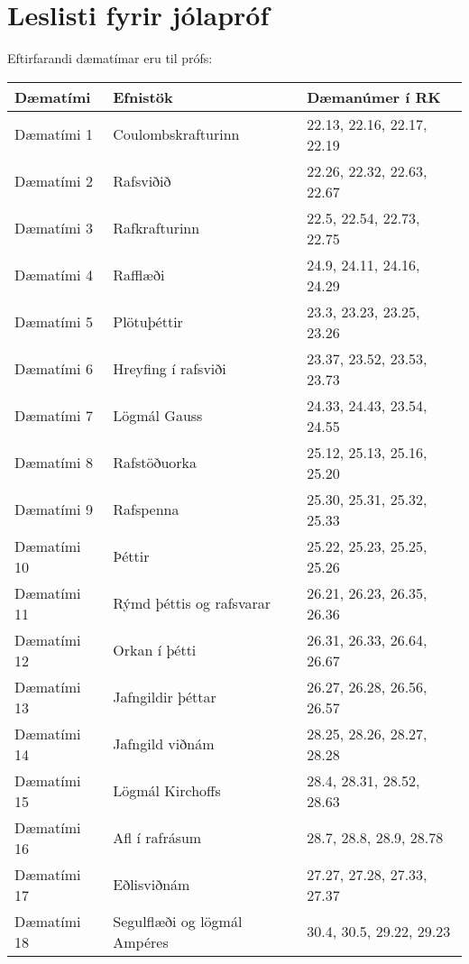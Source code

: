 \section*{Leslisti fyrir jólapróf}

Eftirfarandi dæmatímar eru til prófs:

\begin{table}[H]
    \centering
    \begin{tabular}{|l|l|l|}
    \hline
    \textbf{Dæmatími} & \textbf{Efnistök} & \textbf{Dæmanúmer í RK}
     \\ \hline \hline
        Dæmatími 1 & Coulombskrafturinn & 22.13, 22.16, 22.17, 22.19  \\ \hline
        Dæmatími 2 & Rafsviðið & 22.26, 22.32, 22.63, 22.67 \\ \hline
        Dæmatími 3 & Rafkrafturinn & 22.5, 22.54, 22.73, 22.75 \\ \hline
        Dæmatími 4 & Rafflæði & 24.9, 24.11, 24.16, 24.29 \\ \hline
        Dæmatími 5 & Plötuþéttir & 23.3, 23.23, 23.25, 23.26 \\ \hline
        Dæmatími 6 & Hreyfing í rafsviði & 23.37, 23.52, 23.53, 23.73 \\ \hline
        Dæmatími 7 & Lögmál Gauss & 24.33, 24.43, 23.54, 24.55 \\ \hline
        Dæmatími 8 & Rafstöðuorka & 25.12, 25.13, 25.16, 25.20 \\ \hline
        Dæmatími 9 & Rafspenna &  25.30, 25.31, 25.32, 25.33 \\ \hline
        Dæmatími 10 & Þéttir & 25.22, 25.23, 25.25, 25.26 \\ \hline
        Dæmatími 11 & Rýmd þéttis og rafsvarar & 26.21, 26.23, 26.35, 26.36 \\ \hline
        Dæmatími 12 & Orkan í þétti &  26.31, 26.33, 26.64, 26.67 \\ \hline
        Dæmatími 13 & Jafngildir þéttar & 26.27, 26.28, 26.56, 26.57 \\ \hline
        Dæmatími 14 & Jafngild viðnám & 28.25, 28.26, 28.27, 28.28 \\ \hline
        Dæmatími 15 & Lögmál Kirchoffs & 28.4, 28.31, 28.52, 28.63   \\ \hline
        Dæmatími 16 & Afl í rafrásum & 28.7, 28.8, 28.9, 28.78 \\ \hline
        Dæmatími 17 & Eðlisviðnám & 27.27, 27.28, 27.33, 27.37 \\ \hline 
        Dæmatími 18 & Segulflæði og lögmál Ampéres  & 30.4, 30.5, 29.22, 29.23 \\ \hline

\end{tabular}
\end{table}
